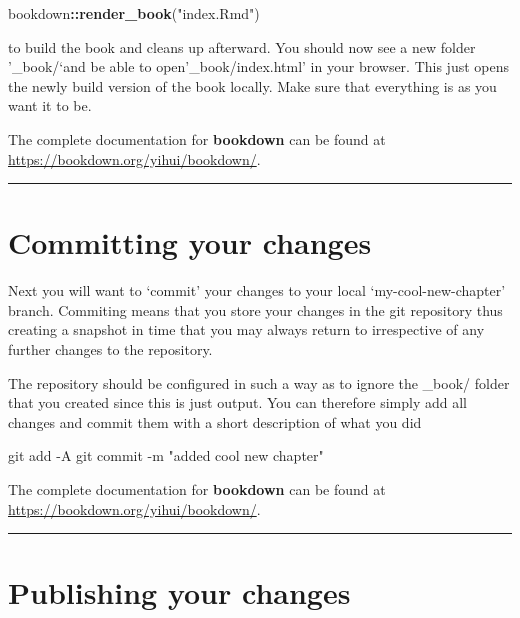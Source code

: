 \documentclass[]{book}
\newenvironment{Shaded}{\begin{snugshade}}{\end{snugshade}}
\newcommand{\KeywordTok}[1]{\textcolor[rgb]{0.13,0.29,0.53}{\textbf{#1}}}
\newcommand{\StringTok}[1]{\textcolor[rgb]{0.31,0.60,0.02}{#1}}
\newcommand{\FunctionTok}[1]{\textcolor[rgb]{0.00,0.00,0.00}{#1}}
\newcommand{\OperatorTok}[1]{\textcolor[rgb]{0.81,0.36,0.00}{\textbf{#1}}}
\newcommand{\NormalTok}[1]{#1}
\begin{document}
\begin{Shaded}
\begin{Highlighting}[]
\NormalTok{bookdown}\OperatorTok{::}\KeywordTok{render_book}\NormalTok{(}\StringTok{"index.Rmd"}\NormalTok{)}
\end{Highlighting}
\end{Shaded}

to build the book and cleans up afterward. You should now see a new
folder '\_book/`and be able to open'\_book/index.html' in your browser.
This just opens the newly build version of the book locally. Make sure
that everything is as you want it to be.

The complete documentation for \textbf{bookdown} can be found at
\url{https://bookdown.org/yihui/bookdown/}.

\begin{center}\rule{0.5\linewidth}{\linethickness}\end{center}

\section{Committing your changes}\label{committing-your-changes}

Next you will want to `commit' your changes to your local
`my-cool-new-chapter' branch. Commiting means that you store your
changes in the git repository thus creating a snapshot in time that you
may always return to irrespective of any further changes to the
repository.

The repository should be configured in such a way as to ignore the
\_book/ folder that you created since this is just output. You can
therefore simply add all changes and commit them with a short
description of what you did

\begin{Shaded}
\begin{Highlighting}[]
\FunctionTok{git}\NormalTok{ add -A}
\FunctionTok{git}\NormalTok{ commit -m }\StringTok{"added cool new chapter"}
\end{Highlighting}
\end{Shaded}

The complete documentation for \textbf{bookdown} can be found at
\url{https://bookdown.org/yihui/bookdown/}.

\begin{center}\rule{0.5\linewidth}{\linethickness}\end{center}

\section{Publishing your changes}\label{publishing-your-changes}
\end{document}
